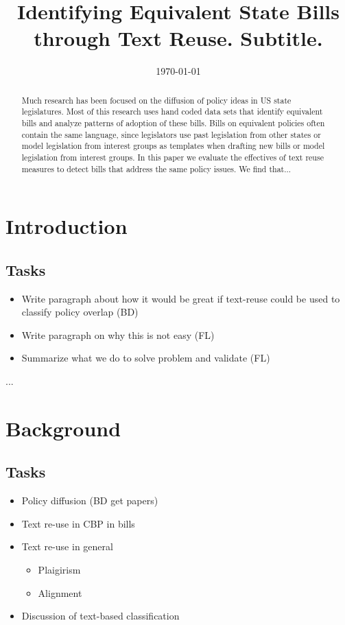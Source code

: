 \documentclass[12pt]{article} %
\begin{document}
 

\title{Identifying Equivalent State Bills through Text Reuse. \large Subtitle.}
\date{\today}
\author{}

\maketitle

\begin{abstract}
Much research has been focused on the diffusion of policy ideas in US state
legislatures. Most of this research uses hand coded data sets that identify
equivalent bills and analyze patterns of adoption of these bills. Bills on
equivalent policies often contain the same language, since legislators use past
legislation from other states or model legislation from interest groups as
templates when drafting new bills or model legislation from interest groups. In
this paper we evaluate the effectives of text reuse measures to detect bills
that address the same policy issues. We find that... 
\end{abstract}

\section{Introduction}

\subsection{Tasks}
\begin{itemize}
\item Write paragraph about how it would be great if text-reuse could be used to classify policy overlap (BD)
\item Write paragraph on why this is not easy (FL)
\item Summarize what we do to solve problem and validate (FL)
\end{itemize}

...

\section{Background}

\subsection{Tasks}
\begin{itemize}
\item Policy diffusion (BD get papers)
\item Text re-use in CBP in bills 
\item Text re-use in general
\begin{itemize}
\item Plaigirism
\item Alignment
\end{itemize} 
\item Discussion of text-based classification
\end{itemize}
\end{document}
